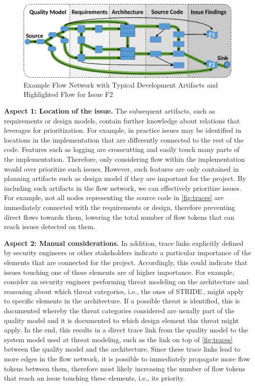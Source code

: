 \begin{figure}
	\centering
	\includegraphics[width=.7\columnwidth]{figures/traces04-KG}%
	\caption{Example Flow Network with Typical Development Artifacts and Highlighted Flow for Issue F2}%
	\label{fig:traces}
\end{figure}

    \textbf{Aspect 1: Location of the issue.} The subsequent artifacts, such as requirements or design models, contain further knowledge about relations that \appr{} leverages for prioritization.
	For example, in practice issues may be identified in locations in the implementation that are differently connected to the rest of the code.
	Features such as logging are crosscutting and easily touch many parts of the implementation.
	Therefore, only considering flow within the implementation would over prioritize such issues.
	However, such features are only contained in planning artifacts such as design model if they are important for the project.
	By including such artifacts in the flow network, we can effectively prioritize issues.
	For example, not all nodes representing the source code in \autoref{fig:traces} are immediately connected with the requirements or design, therefore preventing direct flows towards them, lowering the total number of flow tokens that can reach issues detected on them.

	\textbf{Aspect 2: Manual considerations.} In addition, trace links explicitly defined by security engineers or other stakeholders indicate a particular importance of the elements that are connected for the project.
	Accordingly, this could indicate that issues touching one of these elements are of higher importance.
	For example, consider an security engineer performing threat modeling on the architecture and reasoning about which threat categories, i.e., the ones of STRIDE\,\cite{STRIDE,Shostack2008}, might apply to specific elements in the architecture.
	If a possible threat is identified, this is documented whereby the threat categories considered are usually part of the quality model and it is documented to which design element this threat might apply.
	In the end, this results in a direct trace link from the quality model to the system model used at threat modeling, such as the link on top of \autoref{fig:traces} between the quality model and the architecture.
	Since these trace links lead to more edges in the flow network, it is possible to immediately propagate more flow tokens between them, therefore most likely increasing the number of flow tokens that reach an issue touching these elements, i.e., its priority.

